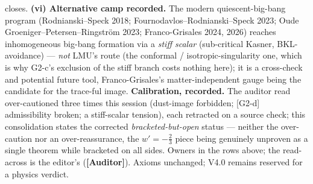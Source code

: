 \documentclass[11pt]{article}
\newcommand{\Auditor}{\textbf{\textcolor{teal!55!black}{[Auditor]}}}
\begin{document}
closes. \textbf{(vi) Alternative camp recorded.} The modern quiescent-big-bang program (Rodnianski--Speck 2018; Fournodavlos--Rodnianski--Speck 2023; Oude Groeniger--Petersen--Ringstr\"om 2023; Franco-Grisales 2024, 2026) reaches inhomogeneous big-bang formation via a \emph{stiff scalar} (sub-critical Kasner, BKL-avoidance) --- \emph{not} LMU's route (the conformal / isotropic-singularity one, which is why G2-c's exclusion of the stiff branch costs nothing here); it is a cross-check and potential future tool, Franco-Grisales's matter-independent gauge being the candidate for the trace-ful image. \textbf{Calibration, recorded.} The auditor read over-cautioned three times this session (dust-image forbidden; [G2-d] admissibility broken; a stiff-scalar tension), each retracted on a source check; this consolidation states the corrected \emph{bracketed-but-open} status --- neither the over-caution nor an over-reassurance, the $w'=-\tfrac23$ piece being genuinely unproven as a single theorem while bracketed on all sides. Owners in the rows above; the read-across is the editor's (\Auditor). Axioms unchanged; V4.0 remains reserved for a physics verdict.
\end{document}
